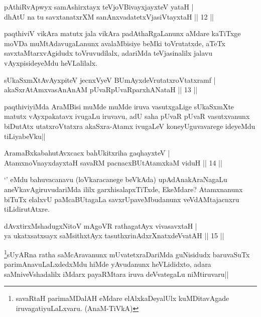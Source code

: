 
\begin{shl}
pAthiRvApwyx samAshirxtayx teVjoV\s BivayxjayxteV yataH |\\
dhAtU na tu savxtanatxrXM sanAnxvadatetxVjasiVtayxtaH \hfill || 12 ||
\end{shl}

\begin{artha}
paqthiviV vikAra matutx jala vikAra padAthaRgaLanunx aMdare kaTiTxge moVDa muMtAdavugaLanunx avalaMbisiye beMki toVrutatxde, aTeTx savxtaMtarxvAgidudx toVruvudilalx, adariMda teVjasinalilx jalavu vAyxpisideyeMdu heVLalilalx.
\end{artha}

\begin{shl}
sUkaSxmXtAvAyxpiteV jecnxVyeV BUmAyxdeVrutatxroVtatxramf |\\
akaSxrAtAmxvasAnAnAM pUvaRpUvaRparxhANataH \hfill || 13 ||
\end{shl}

\begin{artha}%
paqthiviyiMda AraMBisi muMde muMde iruva vasutxgaLige sUkaSxmXte matutx vAyxpakatavx ivugaLu iruvavu, adU saha pUvaR pUvaR vasutxvanunx biDutAtx utatxroVtatxra akaSxra-Atamx ivugaLeV koneyUguvavarege ideyeMdu tiLiyabeVku||
\end{artha}

\begin{shl}
AramaBxkabahutAvxcacx bahUkitxriha gaqhayxteV |\\
AtamxnoV\s nayxdayxtaH savaRM pacnacxBUtAtamxkaM viduH \hfill || 14 ||
\end{shl}

\begin{artha}
`\stext ' eMdu bahuvacanavu (loVkaracanege beVkAda) upAdAnakAraNagaLu aneVkavAgiruvudariMda ililx garxhisalapxTiTxde, EkeMdare? Atamxnanunx biTuTx elalxvU paMcaBUtagaLa savxrUpaveMbudanunx veVdAMtajacnxru tiLidirutAtxre.
\end{artha}

\begin{shl}
dAvxtirxMshadugxNitoV mAgoVR rathagatAyx vivasavxtaH |\\
ya ukatxsatxsayx saMsithxtAyx tasuthxrinAdxrXnatxdeVvatAH \hfill || 15 ||
\end{shl}

\begin{artha}
\footnote[1]{savaRtaH parimaMDalAH eMdare elAlxkaDeyalUlx kuMDitavAgade iruvagatiyuLaLxvaru. (AnaM-TiVkA)}sUyARna ratha saMcAravanunx mUvatetxraDariMda guNisidudx baruvaSuTx parimAnavuLaLxdedxMdu hiMde yAvudanunx heVLididxto, adara saMniveVshadalilx iMdarx payaRMtara iruva deVvategaLu niMtiruvaru||
\end{artha}

